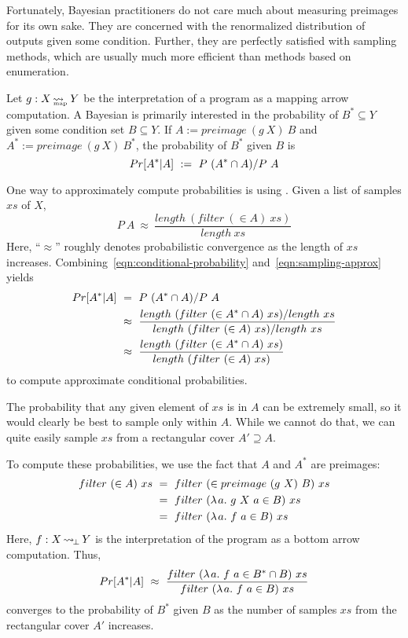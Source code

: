 \documentclass[preprint]{sigplanconf}
\newcommand{\arrow}{\rightsquigarrow}
\DeclareMathOperator{\botto}{\arrow_{\mspace{-3mu}\bot}}
\newcommand{\map}{_\mathrm{map}}
\DeclareMathOperator{\mapto}{\arrow_{\mspace{-21mu}\map}}
\begin{document}
Fortunately, Bayesian practitioners do not care much about measuring preimages for its own sake.
They are concerned with the renormalized distribution of outputs given some condition.
Further, they are perfectly satisfied with sampling methods, which are usually much more efficient than methods based on enumeration.

Let $g : X \mapto Y$ be the interpretation of a program as a mapping arrow computation.
A Bayesian is primarily interested in the probability of $B^* \subseteq Y$ given some condition set $B \subseteq Y$.
If $A := preimage~(g~X)~B$ and $A^* := preimage~(g~X)~B^*$, the probability of $B^*$ given $B$ is
\begin{equation}
	Pr[A^*|A] \ := \ P~(A^* \cap A) / P~A
\label{eqn:conditional-probability}
\end{equation}

One way to approximately compute probabilities is using .
Given a list of samples $xs$ of $X$,
\begin{equation}
	P~A \ \approx \ \frac{length~(filter~(\in A)~xs)}{length~xs}
\label{eqn:sampling-approx}
\end{equation}
Here, ``$\approx$'' roughly denotes probabilistic convergence as the length of $xs$ increases.
Combining~\eqref{eqn:conditional-probability} and~\eqref{eqn:sampling-approx} yields
\begin{equation}
\begin{aligned}
	Pr[A^* | A]
		&\ = \ P~(A^* \cap A) / P~A
\\
		&\ \approx \ \frac{length~(filter~(\in A^* \cap A)~xs) / length~xs}{length~(filter~(\in A)~xs) / length~xs}
\\
		&\ \approx \ \frac{length~(filter~(\in A^* \cap A)~xs)}{length~(filter~(\in A)~xs)}
\end{aligned}
\label{eqn:sampling-approx-conditional}
\end{equation}
to compute approximate conditional probabilities.

The probability that any given element of $xs$ is in $A$ can be extremely small, so it would clearly be best to sample only within $A$.
While we cannot do that, we can quite easily sample $xs$ from a rectangular cover $A' \supseteq A$.

To compute these probabilities, we use the fact that $A$ and $A^*$ are preimages:
\begin{equation}
\begin{aligned}
	filter~(\in A)~xs
		&\ = \ filter~(\in preimage~(g~X)~B)~xs
\\
		&\ = \ filter~(\lambda\mspace{2mu}{a}\ldotp\,{g~X~a \in B})~xs
\\
		&\ = \ filter~(\lambda\mspace{2mu}{a}\ldotp\,{f~a \in B})~xs
\end{aligned}
\end{equation}
Here, $f : X \botto Y$ is the interpretation of the program as a bottom arrow computation.
Thus,
\begin{equation}
	Pr[A^* | A] \ \approx \ \frac{filter~(\lambda\mspace{2mu}{a}\ldotp\,{f~a \in B^* \cap B})~xs}{filter~(\lambda\mspace{2mu}{a}\ldotp\,{f~a \in B})~xs}
\end{equation}
converges to the probability of $B^*$ given $B$ as the number of samples $xs$ from the rectangular cover $A'$ increases.
\end{document}
